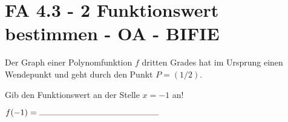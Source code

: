 \section{FA 4.3 - 2 Funktionswert bestimmen - OA - BIFIE}

\begin{beispiel}[FA 4.3]{1} %
				Der Graph einer Polynomfunktion $f$ dritten Grades hat im Ursprung einen Wendepunkt und geht durch den Punkt $P=(1/2)$.

Gib den Funktionswert an der Stelle $x=-1$ an!
\leer

$f(-1)=\rule{5cm}{0.3pt}$
\leer

\end{beispiel}